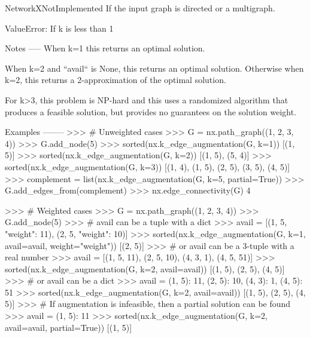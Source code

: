 \begin{DoxyVerb}
NetworkXNotImplemented
    If the input graph is directed or a multigraph.

ValueError:
    If k is less than 1

Notes
-----
When k=1 this returns an optimal solution.

When k=2 and ``avail`` is None, this returns an optimal solution.
Otherwise when k=2, this returns a 2-approximation of the optimal solution.

For k>3, this problem is NP-hard and this uses a randomized algorithm that
    produces a feasible solution, but provides no guarantees on the
    solution weight.

Examples
--------
>>> # Unweighted cases
>>> G = nx.path_graph((1, 2, 3, 4))
>>> G.add_node(5)
>>> sorted(nx.k_edge_augmentation(G, k=1))
[(1, 5)]
>>> sorted(nx.k_edge_augmentation(G, k=2))
[(1, 5), (5, 4)]
>>> sorted(nx.k_edge_augmentation(G, k=3))
[(1, 4), (1, 5), (2, 5), (3, 5), (4, 5)]
>>> complement = list(nx.k_edge_augmentation(G, k=5, partial=True))
>>> G.add_edges_from(complement)
>>> nx.edge_connectivity(G)
4

>>> # Weighted cases
>>> G = nx.path_graph((1, 2, 3, 4))
>>> G.add_node(5)
>>> # avail can be a tuple with a dict
>>> avail = [(1, 5, {"weight": 11}), (2, 5, {"weight": 10})]
>>> sorted(nx.k_edge_augmentation(G, k=1, avail=avail, weight="weight"))
[(2, 5)]
>>> # or avail can be a 3-tuple with a real number
>>> avail = [(1, 5, 11), (2, 5, 10), (4, 3, 1), (4, 5, 51)]
>>> sorted(nx.k_edge_augmentation(G, k=2, avail=avail))
[(1, 5), (2, 5), (4, 5)]
>>> # or avail can be a dict
>>> avail = {(1, 5): 11, (2, 5): 10, (4, 3): 1, (4, 5): 51}
>>> sorted(nx.k_edge_augmentation(G, k=2, avail=avail))
[(1, 5), (2, 5), (4, 5)]
>>> # If augmentation is infeasible, then a partial solution can be found
>>> avail = {(1, 5): 11}
>>> sorted(nx.k_edge_augmentation(G, k=2, avail=avail, partial=True))
[(1, 5)]
\end{DoxyVerb}
 \mbox{\label{namespacenetworkx_1_1algorithms_1_1connectivity_1_1edge__augmentation_af69ca38acad2ed6863fbd62a80f668d1}} 
